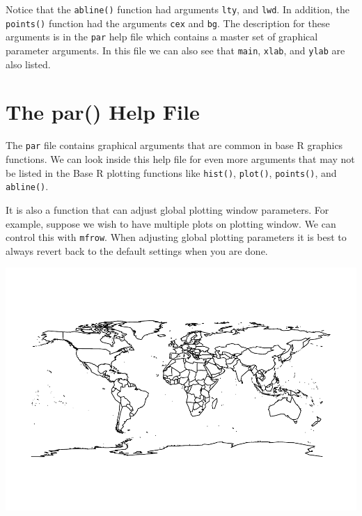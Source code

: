 \documentclass[
]{book}
\newenvironment{Shaded}{\begin{snugshade}}{\end{snugshade}}
\newcommand{\CommentTok}[1]{\textcolor[rgb]{0.56,0.35,0.01}{\textit{#1}}}
\newcommand{\DataTypeTok}[1]{\textcolor[rgb]{0.13,0.29,0.53}{#1}}
\newcommand{\DecValTok}[1]{\textcolor[rgb]{0.00,0.00,0.81}{#1}}
\newcommand{\KeywordTok}[1]{\textcolor[rgb]{0.13,0.29,0.53}{\textbf{#1}}}
\newcommand{\NormalTok}[1]{#1}
\newcommand{\OperatorTok}[1]{\textcolor[rgb]{0.81,0.36,0.00}{\textbf{#1}}}
\begin{document}
Notice that the \texttt{abline()} function had arguments \texttt{lty}, and \texttt{lwd}. In addition, the \texttt{points()} function had the arguments \texttt{cex} and \texttt{bg}. The description for these arguments is in the \texttt{par} help file which contains a master set of graphical parameter arguments. In this file we can also see that \texttt{main}, \texttt{xlab}, and \texttt{ylab} are also listed.

\hypertarget{the-par-help-file}{%
\section{The par() Help File}\label{the-par-help-file}}

The \texttt{par} file contains graphical arguments that are common in base R graphics functions. We can look inside this help file for even more arguments that may not be listed in the Base R plotting functions like \texttt{hist()}, \texttt{plot()}, \texttt{points()}, and \texttt{abline()}.

It is also a function that can adjust global plotting window parameters. For example, suppose we wish to have multiple plots on plotting window. We can control this with \texttt{mfrow}. When adjusting global plotting parameters it is best to always revert back to the default settings when you are done.

\begin{Shaded}
\end{Shaded}

\includegraphics{_main_files/figure-latex/unnamed-chunk-243-1.pdf}
\end{document}
